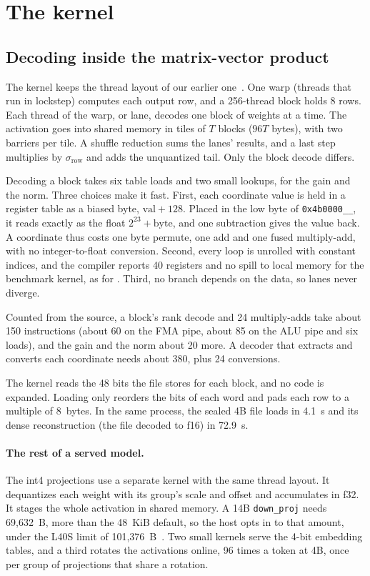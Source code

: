 \section{The kernel}
\label{sec:kernel}

\subsection{Decoding inside the matrix-vector product}

The kernel keeps the thread layout of our earlier one~\citep{llvq1preprint}.
One warp (threads that run in lockstep) computes each output row, and a
256-thread block holds 8 rows. Each thread of the warp, or lane, decodes one
block of weights at a time. The activation goes into shared memory in tiles of
$T$ blocks ($96T$ bytes), with two barriers per tile. A shuffle reduction sums
the lanes' results, and a last step multiplies by $\sigma_{\mathrm{row}}$ and
adds the unquantized tail. Only the block decode differs.

Decoding a block takes six table loads and two small lookups, for the gain and
the norm. Three choices make it fast. First, each coordinate value is held in a
register table as a biased byte, $\mathrm{val}+128$. Placed in the low byte of
\texttt{0x4b0000\_\_}, it reads exactly as the float $2^{23}+\mathrm{byte}$,
and one subtraction gives the value back. A coordinate thus costs one byte
permute, one add and one fused multiply-add, with no integer-to-float
conversion. Second, every loop is unrolled with constant indices, and the
compiler reports 40 registers and no spill to local memory for the benchmark kernel, as
for \Planes{}. Third, no branch depends on the data, so lanes never diverge.

Counted from the source, a block's rank decode and 24 multiply-adds take about
150 instructions (about 60 on the FMA pipe, about 85 on the ALU pipe and six
loads), and the gain and the norm about 20 more. A decoder that extracts and
converts each coordinate needs about 380, plus 24 conversions.

The kernel reads the 48 bits the file stores for each block, and no code is
expanded. Loading only reorders the bits of each word and pads each row to a
multiple of 8~bytes. In the same process, the sealed 4B file loads in 4.1~s
and its dense reconstruction (the file decoded to f16) in 72.9~s.

\paragraph{The rest of a served model.} The int4 projections use a separate
kernel with the same thread layout. It dequantizes each weight with its group's
scale and offset and accumulates in f32. It stages the whole activation in
shared memory. A 14B \texttt{down\_proj} needs 69{,}632~B, more than the
48~KiB default, so the host opts in to that amount, under the L40S limit of
101{,}376~B~\citep{cudaguide}. Two small kernels serve the 4-bit embedding
tables, and a third rotates the activations online, 96 times a token at 4B,
once per group of projections that share a rotation.

